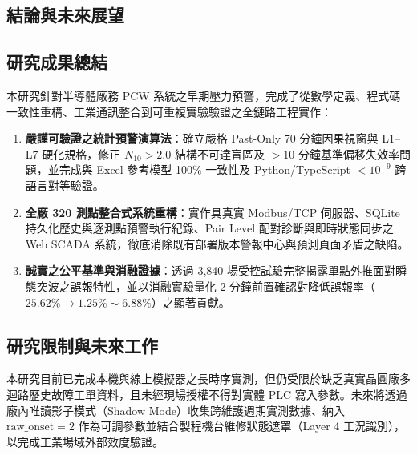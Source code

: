 \documentclass[fontset=none, a4paper, 12pt]{ctexart}
\begin{document}
\begin{doublespace}
\clearpage
\section{結論與未來展望}

\subsection{研究成果總結}
本研究針對半導體廠務 PCW 系統之早期壓力預警，完成了從數學定義、程式碼一致性重構、工業通訊整合到可重複實驗驗證之全鏈路工程實作：
\begin{enumerate}
    \item \textbf{嚴謹可驗證之統計預警演算法}：確立嚴格 Past-Only 70 分鐘因果視窗與 L1–L7 硬化規格，修正 $N_{10}>2.0$ 結構不可達盲區及 $>10$ 分鐘基準偏移失效率問題，並完成與 Excel 參考模型 100\% 一致性及 Python/TypeScript $<10^{-9}$ 跨語言對等驗證。
    \item \textbf{全廠 320 測點整合式系統重構}：實作具真實 Modbus/TCP 伺服器、SQLite 持久化歷史與逐測點預警執行紀錄、Pair Level 配對診斷與即時狀態同步之 Web SCADA 系統，徹底消除既有部署版本警報中心與預測頁面矛盾之缺陷。
    \item \textbf{誠實之公平基準與消融證據}：透過 3,840 場受控試驗完整揭露單點外推面對瞬態突波之誤報特性，並以消融實驗量化 2 分鐘前置確認對降低誤報率（$25.62\% \to 1.25\%\sim 6.88\%$）之顯著貢獻。
\end{enumerate}

\subsection{研究限制與未來工作}
本研究目前已完成本機與線上模擬器之長時序實測，但仍受限於缺乏真實晶圓廠多迴路歷史故障工單資料，且未經現場授權不得對實體 PLC 寫入參數。未來將透過廠內唯讀影子模式（Shadow Mode）收集跨維護週期實測數據、納入 $\text{raw\_onset}=2$ 作為可調參數並結合製程機台維修狀態遮罩（Layer 4 工況識別），以完成工業場域外部效度驗證。


\end{doublespace}
\end{document}

